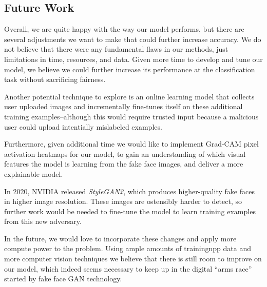 \documentclass[11pt, letterpaper]{article}
\begin{document}
\begin{multicols}{2}
  \subsection{Future Work}
  Overall, we are quite happy with the way our model performs, but
  there are several adjustments we want to make that could further
  increase accuracy. We do not believe that there were any fundamental
  flaws in our methods, just limitations in time, resources, and
  data. Given more time to develop and tune our model, we believe we
  could further increase its performance at the classification task
  without sacrificing fairness.

  Another potential technique to explore is an online learning model that
  collects user uploaded images and incrementally fine-tunes itself on these
  additional training examples--although this would require trusted input
  because a malicious user could upload intentially mislabeled examples.

  Furthermore, given additional time we would like to implement
  Grad-CAM\cite{Selvaraju_2019} pixel activation heatmaps for our
  model, to gain an understanding of which visual features the model
  is learning from the fake face images, and deliver a more
  explainable model.

  In 2020, NVIDIA released \emph{StyleGAN2}\cite{karras2020analyzing},
  which produces higher-quality fake faces in higher image resolution.
  These images are ostensibly harder to detect, so further work would
  be needed to fine-tune the model to learn training examples from
  this new adversary.

  In the future, we would love to incorporate these changes and apply
  more compute power to the problem. Using ample amounts of trainingnpp
  data and more computer vision techniques we believe that there is
  still room to improve on our model, which indeed seems necessary to
  keep up in the digital ``arms race'' started by fake face GAN
  technology.

\end{multicols}



\end{document}
